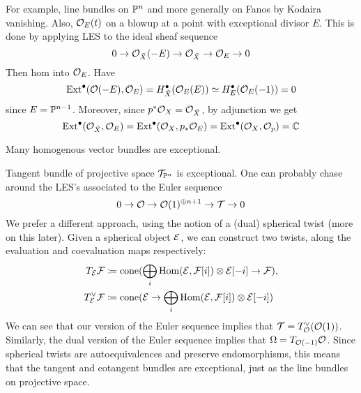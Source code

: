 For example, line bundles on $\P^n$ and more generally on Fanos by Kodaira vanishing. Also, $\O_{E}(t)$ on a blowup at a point with exceptional divisor $E$. This is done by applying LES to the ideal sheaf sequence
\begin{equation*}
    0 \to \O_{\tilde X}(-E) \to \O_{\tilde X} \to \O_E \to 0
\end{equation*}
Then hom into $\O_E$. Have
\begin{equation*}
    \Ext^\bullet(\O(-E),\O_E)
        = H^\bullet_{\tilde X}(\O_E(E))
        \simeq H^\bullet_E(\O_E(-1))=0
\end{equation*}
since $E=\P^{n-1}$. Moreover, since $p^*\O_X=\O_{\tilde X}$, by adjunction we get
\begin{equation*}
    \Ext^\bullet(\O_{\tilde X},\O_E)
        = \Ext^\bullet(\O_X,p_*\O_E)
        = \Ext^\bullet(\O_X,\O_p)
        = \C
\end{equation*}

Many homogenous vector bundles are exceptional.

\begin{example}{Tangent bundle of projective space}{}
    $\mathcal{T}_{\P^n}$ is exceptional. One can probably chase around the LES's associated to the Euler sequence
    \begin{equation*}
        0 \to \O \to \O(1)^{\oplus n+1} \to \calT \to 0
    \end{equation*}
    We prefer a different approach, using the notion of a (dual) spherical twist (more on this later). Given a spherical object $\calE$, we can construct two twists, along the evaluation and coevaluation maps respectively:
    \begin{align*}
        T_\calE\calF
            &\coloneqq \cone(\bigoplus_i\Hom(\calE,\calF[i])\otimes\calE[-i]\to\calF), \\
        T^\vee_\calE\calF
            &\coloneqq \cone(\calE\to\bigoplus_i\Hom(\calE,\calF[i])\otimes\calE[-i] )
    \end{align*}
    We can see that our version of the Euler sequence implies that $\calT=T^\vee_\O(\O(1))$. Similarly, the dual version of the Euler sequence implies that $\Omega=T_{\O(-1)}\O$. Since spherical twists are autoequivalences and preserve endomorphisms, this means that the tangent and cotangent bundles are exceptional, just as the line bundles on projective space.
\end{example}

